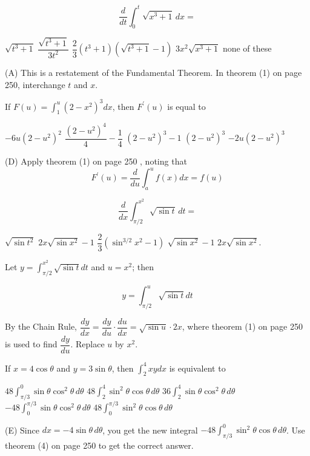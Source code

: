 \question
\[
\dfrac{d}{d t} \int_{0}^{t} \sqrt{x^{3}+1}\,dx=
\]
\begin{choices}
  \CorrectChoice $\sqrt{t^{3}+1}$
  \choice $\dfrac{\sqrt{t^{3}+1}}{3 t^{2}}$
  \choice $\dfrac{2}{3}\left(t^{3}+1\right)\left(\sqrt{t^{3}+1}-1\right)$
  \choice $3 x^{2} \sqrt{x^{3}+1}$
  \choice none of these
\end{choices}
\begin{solution}
(A) This is a restatement of the Fundamental Theorem. In theorem (1) on page 250, interchange $t$ and $x$.
\end{solution}

\question
If $F(u)=\int_{1}^{u}\left(2-x^{2}\right)^{3} d x$, then $F^{\prime}(u)$ is equal to
\begin{choices}
  \choice $-6 u\left(2-u^{2}\right)^{2}$
  \choice $\dfrac{\left(2-u^{2}\right)^{4}}{4}-\dfrac{1}{4}$
  \choice $\left(2-u^{2}\right)^{3}-1$
  \CorrectChoice $\left(2-u^{2}\right)^{3}$
  \choice $-2 u\left(2-u^{2}\right)^{3}$
\end{choices}
\begin{solution}
(D) Apply theorem (1) on page 250 , noting that
\[
F^{\prime}(u)=\dfrac{d}{d u} \int_{a}^{u} f(x) d x=f(u)
\]
\end{solution}




\newpage




\question
\[
\dfrac{d}{d x} \int_{\pi / 2}^{x^{2}} \sqrt{\sin t}\,dt=
\]
\begin{choices}
  \choice $\sqrt{\sin t^{2}}$
  \choice $2 x \sqrt{\sin x^{2}}-1$
  \choice $\dfrac{2}{3}\left(\sin ^{3 / 2} x^{2}-1\right)$
  \choice $\sqrt{\sin x^{2}}-1$
  \CorrectChoice $2 x \sqrt{\sin x^{2}}$.
\end{choices}
\begin{solution}
Let $y=\int_{\pi / 2}^{x^{2}} \sqrt{\sin t} d t$ and $u=x^{2}$; then


\[
y=\int_{\pi / 2}^{u} \sqrt{\sin t} d t
\]

By the Chain Rule, $\dfrac{d y}{d x}=\dfrac{d y}{d u} \cdot \dfrac{d u}{d x}=\sqrt{\sin u} \cdot 2 x$, where theorem (1) on page 250 is used to find $\dfrac{d y}{d u}$. Replace $u$ by $x^{2}$.
\end{solution}

\question
If $x=4 \cos \theta$ and $y=3 \sin \theta$, then $\int_{2}^{4} x y d x$ is equivalent to
\begin{choices}
  \choice $48 \int_{\pi / 3}^{0} \sin \theta \cos ^{2} \theta\,d\theta$
  \choice $48 \int_{2}^{4} \sin ^{2} \theta \cos \theta\,d\theta$
  \choice $36 \int_{2}^{4} \sin \theta \cos ^{2} \theta\,d\theta$
  \choice $-48 \int_{0}^{\pi / 3} \sin \theta \cos ^{2} \theta\,d\theta$
  \CorrectChoice $48 \int_{0}^{\pi / 3} \sin ^{2} \theta \cos \theta\,d\theta$
\end{choices}
\begin{solution}
(E) Since $d x=-4 \sin \theta\,d\theta$, you get the new integral $-48 \int_{\pi / 3}^{0} \sin ^{2} \theta \cos \theta\,d\theta$. Use theorem (4) on page 250 to get the correct answer.
\end{solution}

